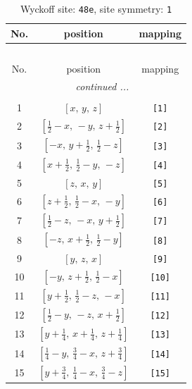 \documentclass[fleqn,8pt]{jsarticle}
\begin{document}
\begin{longtable}{ccc}
\caption{Wyckoff site: {\tt 48e}, site symmetry: {\tt 1}}
 \\
 \hline \hline
No. & position & mapping \\ \hline \endfirsthead

\multicolumn{2}{l}{\tablename\ \thetable{}} \\
 \hline \hline
No. & position & mapping \\ \hline \endhead

 \hline \hline
\multicolumn{2}{r}{\footnotesize\it continued ...} \\ \endfoot

 \hline \hline
\multicolumn{2}{r}{} \\ \endlastfoot

1 & $\left[ x,\, y,\, z \right]$ & {\tt [1]} \\ \hline
2 & $\left[ \frac{1}{2} - x,\, - y,\, z + \frac{1}{2} \right]$ & {\tt [2]} \\ \hline
3 & $\left[ - x,\, y + \frac{1}{2},\, \frac{1}{2} - z \right]$ & {\tt [3]} \\ \hline
4 & $\left[ x + \frac{1}{2},\, \frac{1}{2} - y,\, - z \right]$ & {\tt [4]} \\ \hline
5 & $\left[ z,\, x,\, y \right]$ & {\tt [5]} \\ \hline
6 & $\left[ z + \frac{1}{2},\, \frac{1}{2} - x,\, - y \right]$ & {\tt [6]} \\ \hline
7 & $\left[ \frac{1}{2} - z,\, - x,\, y + \frac{1}{2} \right]$ & {\tt [7]} \\ \hline
8 & $\left[ - z,\, x + \frac{1}{2},\, \frac{1}{2} - y \right]$ & {\tt [8]} \\ \hline
9 & $\left[ y,\, z,\, x \right]$ & {\tt [9]} \\ \hline
10 & $\left[ - y,\, z + \frac{1}{2},\, \frac{1}{2} - x \right]$ & {\tt [10]} \\ \hline
11 & $\left[ y + \frac{1}{2},\, \frac{1}{2} - z,\, - x \right]$ & {\tt [11]} \\ \hline
12 & $\left[ \frac{1}{2} - y,\, - z,\, x + \frac{1}{2} \right]$ & {\tt [12]} \\ \hline
13 & $\left[ y + \frac{1}{4},\, x + \frac{1}{4},\, z + \frac{1}{4} \right]$ & {\tt [13]} \\ \hline
14 & $\left[ \frac{1}{4} - y,\, \frac{3}{4} - x,\, z + \frac{3}{4} \right]$ & {\tt [14]} \\ \hline
15 & $\left[ y + \frac{3}{4},\, \frac{1}{4} - x,\, \frac{3}{4} - z \right]$ & {\tt [15]} \\ \hline

\end{longtable}
\end{document}
